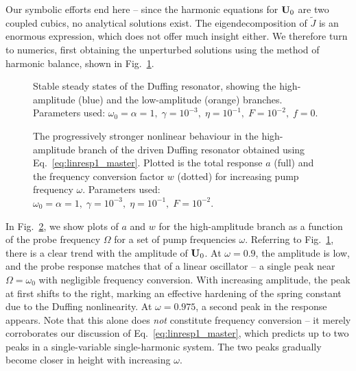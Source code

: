 Our symbolic efforts end here -- since the harmonic equations for $\vb{U}_0$ are two coupled cubics, no analytical solutions exist. The eigendecomposition of $\tilde{J}$ is an enormous expression, which does not offer much insight either. We therefore turn to numerics, first obtaining the unperturbed solutions using the method of harmonic balance, shown in Fig.~\ref{fig:linresp_Duffing_ref}.
\begin{figure} [h!]
	\centering
	\vspace*{-2mm}
	
	\caption{Stable steady states of the Duffing resonator, showing the high-amplitude (blue) and the low-amplitude (orange) branches. Parameters used: $\omega_0 = \alpha = 1, \; \gamma = 10^{-3} , \; \eta = 10^{-1},\; F = 10^{-2}, \;f=0$.}
	\label{fig:linresp_Duffing_ref} 
\end{figure}

\begin{figure} [h!]
	\centering
	
	\caption{The progressively stronger nonlinear behaviour in the high-amplitude branch of the driven Duffing resonator obtained using Eq.~\eqref{eq:linresp1_master}. Plotted is the total response $a$ (full) and the frequency conversion factor $w$ (dotted) for increasing pump frequency $\omega$. Parameters used: $\omega_0 = \alpha = 1, \; \gamma = 10^{-3} , \; \eta = 10^{-1},\; F = 10^{-2}$.}
	\label{fig:linresp_Duffing_hi} 
\end{figure}

In Fig.~\ref{fig:linresp_Duffing_hi}, we show plots of $a$ and $w$ for the high-amplitude branch as a function of the probe frequency $\Omega$ for a set of pump frequencies $\omega$. Referring to Fig.~\ref{fig:linresp_Duffing_ref}, there is a clear trend with the amplitude of $\vb{U}_0$. At $\omega=0.9$, the amplitude is low, and the probe response matches that of a linear oscillator -- a single peak near $\Omega = \omega_0$ with negligible frequency conversion. With increasing amplitude, the peak at first shifts to the right, marking an effective hardening of the spring constant due to the Duffing nonlinearity. At $\omega = 0.975$, a second peak in the response appears. Note that this alone does \textit{not} constitute frequency conversion -- it merely corroborates our discussion of Eq.~\eqref{eq:linresp1_master}, which predicts up to two peaks in a single-variable single-harmonic system. The two peaks gradually become closer in height with increasing $\omega$. 


